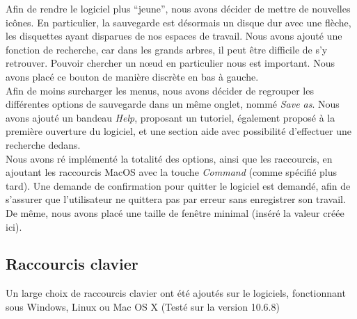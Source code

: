 \documentclass[12pt, a4paper]{article}
\begin{document}
Afin de rendre le logiciel plus ``jeune'', nous avons décider de mettre de nouvelles icônes. En particulier, la sauvegarde est désormais un disque dur avec une flèche, les disquettes ayant disparues de nos espaces de travail. Nous avons ajouté une fonction de recherche, car dans les grands arbres, il peut être difficile de s'y retrouver. Pouvoir chercher un nœud en particulier nous est important. Nous avons placé ce bouton de manière discrète en bas à gauche.\\


Afin de moins surcharger les menus, nous avons décider de regrouper les différentes options de sauvegarde dans un même onglet, nommé \emph{Save as}. Nous avons ajouté un bandeau \emph{Help}, proposant un tutoriel, également proposé à la première ouverture du logiciel, et une section aide avec possibilité d'effectuer une recherche dedans.\\


Nous avons ré implémenté la totalité des options, ainsi que les raccourcis, en ajoutant les raccourcis MacOS avec la touche \emph{Command} (comme spécifié plus tard). Une demande de confirmation pour quitter le logiciel est demandé, afin de s'assurer que l'utilisateur ne quittera pas par erreur sans enregistrer son travail. De même, nous avons placé une taille de fenêtre minimal (inséré la valeur créée ici).

\textcolor{NavyBlue}{\subsection{Raccourcis clavier}}

Un large choix de raccourcis clavier ont été ajoutés sur le logiciels, fonctionnant sous Windows, Linux ou Mac OS X (Testé sur la version 10.6.8)
\end{document}
